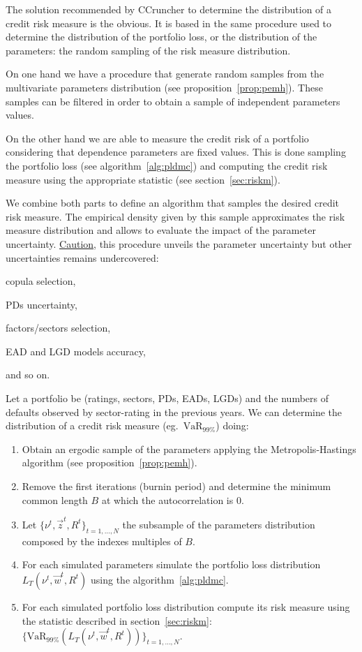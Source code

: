 \documentclass[11pt,fleqn]{book} %
\begin{document}
The solution recommended by CCruncher to determine the distribution of a
credit risk measure is the obvious. It is based in the same procedure 
used to determine the distribution of the portfolio loss, or the distribution 
of the parameters: the random sampling of the risk measure distribution. 

On one hand we have a procedure that generate random samples from the 
multivariate parameters distribution (see proposition~\ref{prop:pemh}).
These samples can be filtered in order to obtain a sample of independent
parameters values.

On the other hand we are able to measure the credit risk of a portfolio 
considering that dependence parameters are fixed values. This is done 
sampling the portfolio loss (see algorithm~\ref{alg:pldmc}) and computing 
the credit risk measure using the appropriate statistic (see 
section~\ref{sec:riskm}).

We combine both parts to define an algorithm that samples the desired
credit risk measure. The empirical density given by this sample 
approximates the risk measure distribution and allows to evaluate the 
impact of the parameter uncertainty. \ul{Caution}, this procedure unveils 
the parameter uncertainty but other uncertainties remains undercovered:
\begin{inparaenum}[1)]
	\item copula selection, 
	\item PDs uncertainty,
	\item factors/sectors selection,
	\item EAD and LGD models accuracy,
	\item and so on.
\end{inparaenum}

\begin{algorithm}
	\label{alg:crmd}
	Let a portfolio be (ratings, sectors, PDs, EADs, LGDs) and the numbers 
	of defaults observed by sector-rating in the previous years. We can
	determine the distribution of a credit risk measure 
	(eg.\ $\text{VaR}_{99\%}$) doing:
	\begin{enumerate}
		\item Obtain an ergodic sample of the parameters applying the
		Metropolis-Hastings algorithm (see proposition~\ref{prop:pemh}).
		\item Remove the first iterations (burnin period) and determine
		the minimum common length $B$ at which the autocorrelation is $0$.
		\item Let $\{\nu^t, \vec{z}^t, R^t\}_{t=1,\dots,N}$ the subsample
		of the parameters distribution composed by the indexes multiples 
		of $B$.
		\item For each simulated parameters simulate the portfolio loss 
		distribution $L_T(\nu^t,\vec{w}^t,R^t)$ using the algorithm~\ref{alg:pldmc}.
		\item For each simulated portfolio loss distribution compute its 
		risk measure using the statistic described in section~\ref{sec:riskm}:
		$\{\text{VaR}_{99\%}(L_T(\nu^t,\vec{w}^t,R^t))\}_{t=1,\dots,N}$.
	\end{enumerate}
\end{algorithm}
\end{document}
